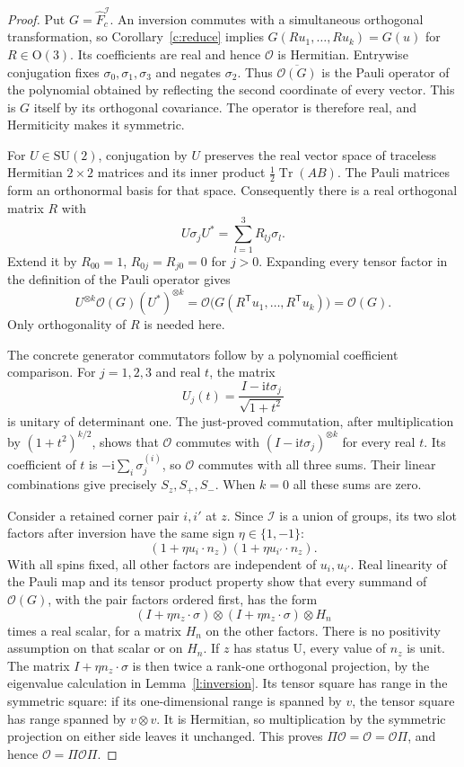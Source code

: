 \begin{proof}
Put \(G=\widehat F_c^{\mathcal I}\).  An inversion commutes with
a simultaneous orthogonal transformation, so Corollary~\ref{c:reduce}
implies \(G(Ru_1,\ldots,Ru_k)=G(u)\) for \(R\in\mathrm O(3)\).
Its coefficients are real and hence \(\mathcal O\) is Hermitian.
Entrywise conjugation fixes \(\sigma_0,\sigma_1,\sigma_3\) and
negates \(\sigma_2\).  Thus \(\overline{\mathcal O(G)}\) is the
Pauli operator of the polynomial obtained by reflecting the
second coordinate of every vector.  This is \(G\) itself by
its orthogonal covariance.  The operator is therefore real,
and Hermiticity makes it symmetric.

For \(U\in\mathrm{SU}(2)\), conjugation by \(U\) preserves the
real vector space of traceless Hermitian \(2\times2\) matrices
and its inner product \(\tfrac12\operatorname{Tr}(AB)\).
The Pauli matrices form an orthonormal basis for that space.
Consequently there is a real orthogonal matrix \(R\) with
\[
 U\sigma_jU^*=\sum_{l=1}^3R_{lj}\sigma_l.
\]
Extend it by \(R_{00}=1\), \(R_{0j}=R_{j0}=0\) for \(j>0\).
Expanding every tensor factor in the definition of the Pauli
operator gives
\[
 U^{\otimes k}\mathcal O(G)(U^*)^{\otimes k}
       =\mathcal O\bigl(G(R^{\mathsf T}u_1,\ldots,
                                      R^{\mathsf T}u_k)\bigr)
       =\mathcal O(G).
\]
Only orthogonality of \(R\) is needed here.

The concrete generator commutators follow by a polynomial
coefficient comparison.  For \(j=1,2,3\) and real \(t\), the
matrix
\[
 U_j(t)=\frac{I-\mathrm i t\sigma_j}{\sqrt{1+t^2}}
\]
is unitary of determinant one.  The just-proved commutation,
after multiplication by \((1+t^2)^{k/2}\), shows that
\(\mathcal O\) commutes with \((I-\mathrm i t\sigma_j)^{\otimes k}\)
for every real \(t\).  Its coefficient of \(t\) is
\(-\mathrm i\sum_i\sigma_j^{(i)}\), so \(\mathcal O\) commutes
with all three sums.  Their linear combinations give precisely
\(S_z,S_+,S_-\).  When \(k=0\) all these sums are zero.

Consider a retained corner pair \(i,i'\) at \(z\).
Since \(\mathcal I\) is a union of groups, its two slot factors
after inversion have the same sign \(\eta\in\{1,-1\}\):
\[
 (1+\eta u_i\cdot n_z)(1+\eta u_{i'}\cdot n_z).
\]
With all spins fixed, all other factors are independent of
\(u_i,u_{i'}\).  Real linearity of the Pauli map and its tensor
product property show that every summand of \(\mathcal O(G)\),
with the pair factors ordered first, has the form
\[
 (I+\eta n_z\cdot\sigma)\otimes
 (I+\eta n_z\cdot\sigma)\otimes H_n
\]
times a real scalar, for a matrix \(H_n\) on the other factors.
There is no positivity assumption on that scalar or on \(H_n\).
If \(z\) has status \(\mathrm U\), every value of \(n_z\) is
unit.  The matrix \(I+\eta n_z\cdot\sigma\) is then twice a
rank-one orthogonal projection, by the eigenvalue calculation
in Lemma~\ref{l:inversion}.  Its tensor square has range in
the symmetric square: if its one-dimensional range is spanned
by \(v\), the tensor square has range spanned by \(v\otimes v\).
It is Hermitian, so multiplication by the symmetric projection
on either side leaves it unchanged.  This proves
\(\Pi\mathcal O=\mathcal O=\mathcal O\Pi\), and hence
\(\mathcal O=\Pi\mathcal O\Pi\).


\end{proof}
